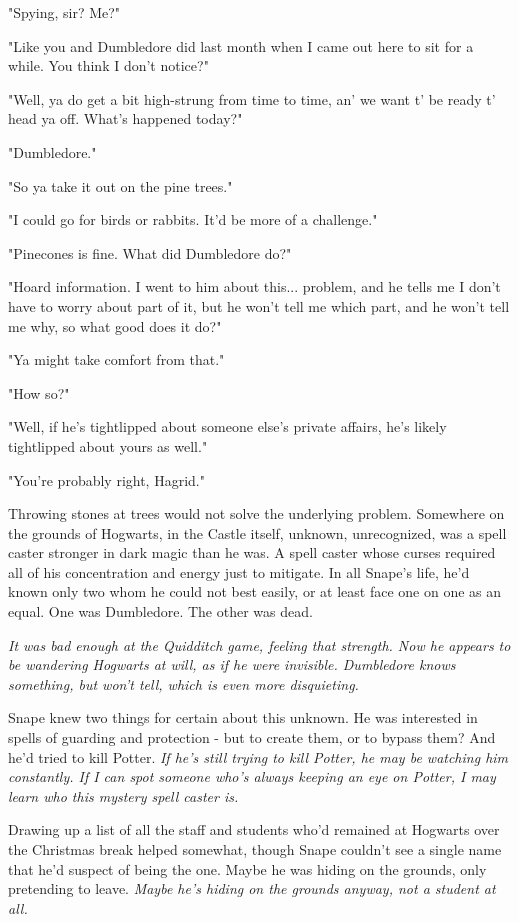 "Spying, sir? Me?"

"Like you and Dumbledore did last month when I came out here to sit for a while. You think I don't notice?"

"Well, ya do get a bit high-strung from time to time, an' we want t' be ready t' head ya off. What's happened today?"

"Dumbledore."

"So ya take it out on the pine trees."

"I could go for birds or rabbits. It'd be more of a challenge."

"Pinecones is fine. What did Dumbledore do?"

"Hoard information. I went to him about this... problem, and he tells me I don't have to worry about part of it, but he won't tell me which part, and he won't tell me why, so what good does it do?"

"Ya might take comfort from that."

"How so?"

"Well, if he's tightlipped about someone else's private affairs, he's likely tightlipped about yours as well."

"You're probably right, Hagrid."

Throwing stones at trees would not solve the underlying problem. Somewhere on the grounds of Hogwarts, in the Castle itself, unknown, unrecognized, was a spell caster stronger in dark magic than he was. A spell caster whose curses required all of his concentration and energy just to mitigate. In all Snape's life, he'd known only two whom he could not best easily, or at least face one on one as an equal. One was Dumbledore. The other was dead.

\emph{It was bad enough at the Quidditch game, feeling that strength. Now he appears to be wandering Hogwarts at will, as if he were invisible. Dumbledore knows something, but won't tell, which is even more disquieting.}

Snape knew two things for certain about this unknown. He was interested in spells of guarding and protection - but to create them, or to bypass them? And he'd tried to kill Potter. \emph{If he's still trying to kill Potter, he may be watching him constantly. If I can spot someone who's always keeping an eye on Potter, I may learn who this mystery spell caster is.}

Drawing up a list of all the staff and students who'd remained at Hogwarts over the Christmas break helped somewhat, though Snape couldn't see a single name that he'd suspect of being the one. Maybe he was hiding on the grounds, only pretending to leave. \emph{Maybe he's hiding on the grounds anyway, not a student at all.}

